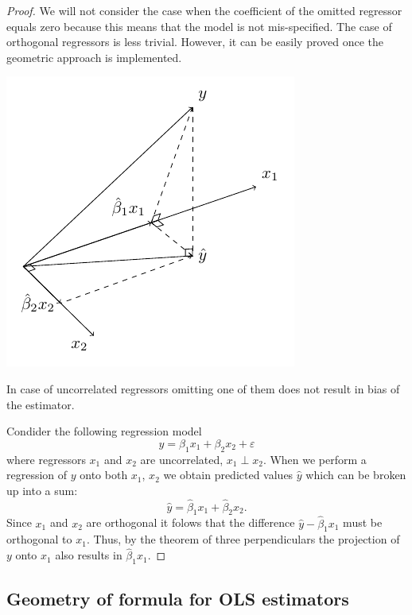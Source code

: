 \begin{proof}
We will not consider the case when the coefficient of the omitted regressor
equals zero because this means that the model is not mis-specified.
The case of orthogonal regressors is less trivial.
However, it can be easily proved once the geometric approach is implemented.

\begin{marginfigure}
\includegraphics[scale=0.7]{figures/02_uncorrelated_regressors.pdf}
\label{fig:uncorrelated_regressors}
\caption{In case of uncorrelated regressors omitting one of them
does not result in bias of the estimator.}
\end{marginfigure}

Condider the following regression model
\[
y = \beta_1 x_1 + \beta_2 x_2 + \varepsilon
\]
where regressors $x_1$ and $x_2$ are uncorrelated, $x_1 \perp x_2$.
When we perform a regression of $y$ onto both $x_1$, $x_2$
we obtain predicted values $\hat y$ which can be broken up into a sum:
\[
\hat y = \hat \beta_1 x_1 + \hat \beta_2 x_2.
\]
Since $x_1$ and $x_2$ are orthogonal it folows that
the difference $\hat y - \hat \beta_1 x_1$ must be orthogonal to $x_1$.
Thus, by the theorem of three perpendiculars the projection of $y$ onto
$x_1$ also results in $\hat \beta_1 x_1$.
\end{proof}

\vspace{4cm}
\subsection{Geometry of formula for OLS estimators}

